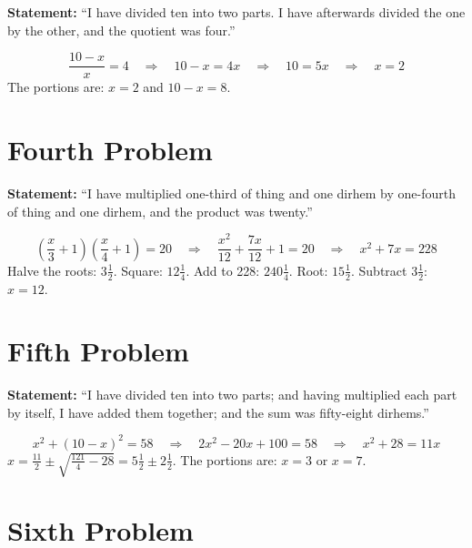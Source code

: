 \documentclass[11pt,a4paper]{book}
\begin{document}
\textbf{Statement:} ``I have divided ten into two parts. I have afterwards
divided the one by the other, and the quotient was four.''

\begin{mathbox}
\begin{equation}
\frac{10 - x}{x} = 4 \quad\Rightarrow\quad 10 - x = 4x \quad\Rightarrow\quad 10 = 5x \quad\Rightarrow\quad x = 2
\end{equation}
The portions are: $x = 2$ and $10 - x = 8$.
\end{mathbox}

\section*{Fourth Problem}

\textbf{Statement:} ``I have multiplied one-third of thing and one dirhem by
one-fourth of thing and one dirhem, and the product was twenty.''

\begin{mathbox}
\begin{equation}
\left(\frac{x}{3} + 1\right)\left(\frac{x}{4} + 1\right) = 20
\quad\Rightarrow\quad \frac{x^2}{12} + \frac{7x}{12} + 1 = 20
\quad\Rightarrow\quad x^2 + 7x = 228
\end{equation}
Halve the roots: $3\frac{1}{2}$. Square: $12\frac{1}{4}$. Add to 228: $240\frac{1}{4}$.
Root: $15\frac{1}{2}$. Subtract $3\frac{1}{2}$: $x = 12$.
\end{mathbox}

\section*{Fifth Problem}

\textbf{Statement:} ``I have divided ten into two parts; and having
multiplied each part by itself, I have added them together; and the sum was
fifty-eight dirhems.''

\begin{mathbox}
\begin{equation}
x^2 + (10-x)^2 = 58 \quad\Rightarrow\quad 2x^2 - 20x + 100 = 58
\quad\Rightarrow\quad x^2 + 28 = 11x
\end{equation}
$x = \frac{11}{2} \pm \sqrt{\frac{121}{4} - 28} = 5\frac{1}{2} \pm 2\frac{1}{2}$.
The portions are: $x = 3$ or $x = 7$.
\end{mathbox}

\section*{Sixth Problem}
\end{document}
